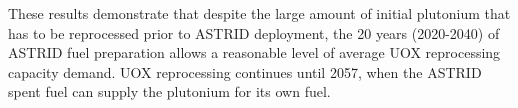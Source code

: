 These results demonstrate that despite the large amount of initial plutonium that has to be reprocessed
prior to \gls{ASTRID} deployment, the 20 years (2020-2040) of 
\gls{ASTRID} fuel preparation
allows a reasonable level of average
\gls{UOX} reprocessing capacity demand. \gls{UOX} reprocessing continues 
until 2057, when the \gls{ASTRID} spent fuel can supply the plutonium
for its own fuel.

